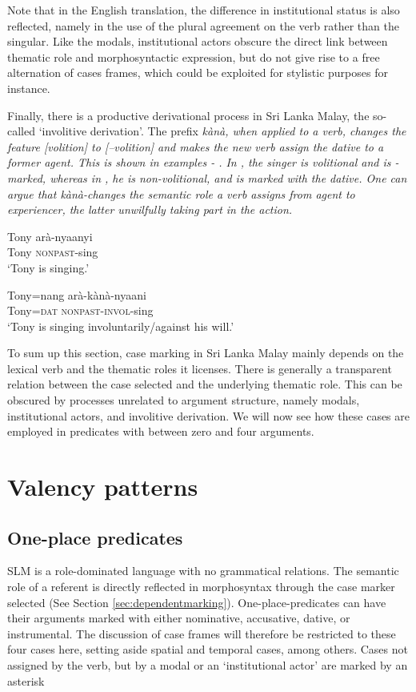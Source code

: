 \documentclass[a4paper,10pt]{article}
\begin{document}
Note that in the English translation, the difference in institutional status is also reflected, namely in the use of the plural agreement on the verb rather than the singular. Like the modals, institutional actors obscure the direct link between thematic role and morphosyntactic expression, but do not give rise to a free alternation of cases frames, which could be exploited for stylistic purposes for instance.


Finally, there is a productive derivational process in Sri Lanka Malay, the so-called `involitive derivation'. The prefix \em kànà\em, when applied to a verb, changes the feature [volition] to [--volition] and makes the new verb assign the dative to a former agent. This is shown in examples  - . In , the singer is volitional and is \zero{}-marked, whereas in , he is non-volitional, and is marked with the dative. One can argue that \em kànà-\em changes the semantic role a verb assigns from agent to experiencer, the latter unwilfully taking part in the action.

\ea\label{ex:kana:nokana}
\gll Tony arà-nyaanyi\\
     Tony \textsc{nonpast}-sing\\
     `Tony is singing.'
\z

\ea\label{ex:kana:kana}
\gll Tony=nang arà-kànà-nyaani\\
    Tony=\textsc{dat} \textsc{nonpast}-\textsc{invol}-sing\\
   `Tony is singing involuntarily/against his will.'
\z 


To sum up this section, case marking in Sri Lanka Malay mainly depends on the lexical verb and the thematic roles it licenses. There is generally a transparent relation between the case selected and the underlying thematic role. This can be obscured by processes unrelated to argument structure, namely modals, institutional actors, and involitive derivation.
We will now see how these cases are employed in predicates with between zero and four arguments.

\section{Valency patterns}

\subsection{One-place predicates}
SLM is a role-dominated language with no grammatical relations. The semantic role of a referent is directly reflected in morphosyntax through the case marker selected (See Section \ref{sec:dependentmarking}). One-place-predicates can have their arguments marked with either nominative, accusative, dative, or instrumental. The discussion of case frames will therefore be restricted to these four cases here, setting aside spatial and temporal cases, among others. Cases not assigned by the verb, but by a modal or an `institutional actor' are marked by an asterisk
\end{document}
